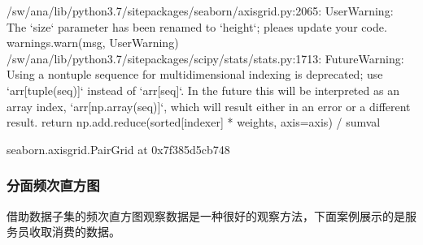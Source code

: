 \documentclass[letterpaper,10pt,english]{sphinxhowto}
\begin{document}
%
\begin{sphinxVerbatim}[commandchars=\\\{\}]
/sw/ana/lib/python3.7/site\PYGZhy{}packages/seaborn/axisgrid.py:2065: UserWarning: The {}`size{}` parameter has been renamed to {}`height{}`; pleaes update your code.
  warnings.warn(msg, UserWarning)
/sw/ana/lib/python3.7/site\PYGZhy{}packages/scipy/stats/stats.py:1713: FutureWarning: Using a non\PYGZhy{}tuple sequence for multidimensional indexing is deprecated; use {}`arr[tuple(seq)]{}` instead of {}`arr[seq]{}`. In the future this will be interpreted as an array index, {}`arr[np.array(seq)]{}`, which will result either in an error or a different result.
  return np.add.reduce(sorted[indexer] * weights, axis=axis) / sumval





\PYGZlt{}seaborn.axisgrid.PairGrid at 0x7f385d5cb748\PYGZgt{}
\end{sphinxVerbatim}



\subsubsection{分面频次直方图}
\label{\detokenize{Seaborn_u6570_u636e_u53ef_u89c6_u5316:id3}}
借助数据子集的频次直方图观察数据是一种很好的观察方法，下面案例展示的是服务员收取消费的数据。

%
\begin{sphinxVerbatim}[commandchars=\\\{\}]
  
\end{sphinxVerbatim}



%
\begin{sphinxVerbatim}[commandchars=\\\{\}]
    
     

   
     
\end{sphinxVerbatim}
\end{document}
